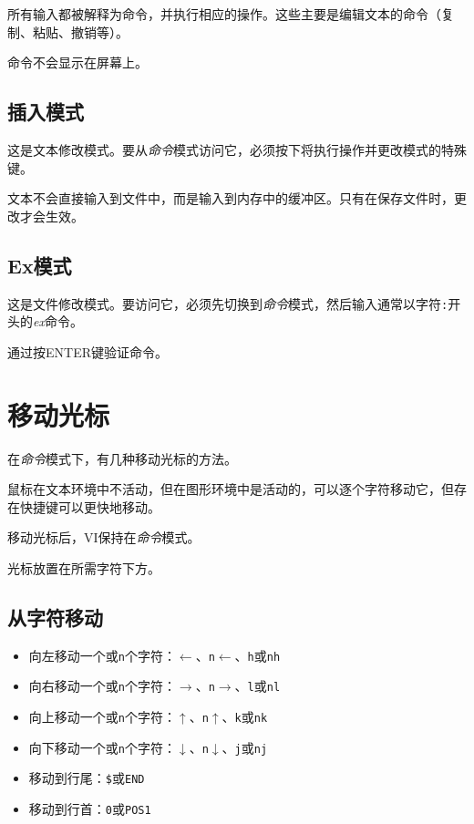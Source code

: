 \documentclass[12pt,a4paper,twoside]{ctexbook}
\begin{document}
所有输入都被解释为命令，并执行相应的操作。这些主要是编辑文本的命令（复制、粘贴、撤销等）。

命令不会显示在屏幕上。

\subsection{插入模式}

这是文本修改模式。要从\textit{命令}模式访问它，必须按下将执行操作并更改模式的特殊键。

文本不会直接输入到文件中，而是输入到内存中的缓冲区。只有在保存文件时，更改才会生效。

\subsection{Ex模式}

这是文件修改模式。要访问它，必须先切换到\textit{命令}模式，然后输入通常以字符\texttt{:}开头的\textit{ex}命令。

通过按ENTER键验证命令。

\section{移动光标}

在\textit{命令}模式下，有几种移动光标的方法。

鼠标在文本环境中不活动，但在图形环境中是活动的，可以逐个字符移动它，但存在快捷键可以更快地移动。

移动光标后，VI保持在\textit{命令}模式。

光标放置在所需字符下方。

\subsection{从字符移动}

\begin{itemize}
    \item 向左移动一个或\texttt{n}个字符：\texttt{$\leftarrow$}、\texttt{n$\leftarrow$}、\texttt{h}或\texttt{nh}
    \item 向右移动一个或\texttt{n}个字符：\texttt{$\rightarrow$}、\texttt{n$\rightarrow$}、\texttt{l}或\texttt{nl}
    \item 向上移动一个或\texttt{n}个字符：\texttt{$\uparrow$}、\texttt{n$\uparrow$}、\texttt{k}或\texttt{nk}
    \item 向下移动一个或\texttt{n}个字符：\texttt{$\downarrow$}、\texttt{n$\downarrow$}、\texttt{j}或\texttt{nj}
    \item 移动到行尾：\texttt{\$}或\texttt{END}
    \item 移动到行首：\texttt{0}或\texttt{POS1}
\end{itemize}
\end{document}
